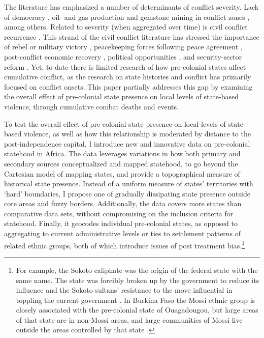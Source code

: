 \documentclass[12pt]{article}
\begin{document}
The literature has emphasized a number of determinants of conflict severity.
Lack of democracy \citep{Lacina_2006}, oil- and gas production and gemstone
mining in conflict zones \citep{Lujala_2008}, among others. Related to severity
(when aggregated over time) is civil conflict recurrence \citep{Collier2003b}.
This strand of the civil conflict literature has stressed the importance of
rebel or military victory \citep{Luttwak_1999, Quinn2007, Toft_2010},
peacekeeping forces following peace agreement \citep{Collier_2008, Quinn2007},
post-conflict economic recovery \citep{Collier_2008, Quinn2007}, political
opportunities \citep{Walter_2004}, and security-sector reform \citep{Toft_2009}.
Yet, to date there is limited research of how pre-colonial states affect
cumulative conflict, as the research on state histories and conflict has
primarily focused on conflict onsets. This paper partially addresses this gap by
examining the overall effect of pre-colonial state presence on local levels of
state-based violence, through cumulative combat deaths and events. 

To test the overall effect of pre-colonial state presence on local levels of
state-based violence, as well as how this relationship is moderated by distance
to the post-independence capital, I introduce new and innovative data on
pre-colonial statehood in Africa. The data leverages variations in how both
primary and secondary sources conceptualized and mapped statehood, to go beyond
the Cartesian model of mapping states, and provide a topographical measure of
historical state presence. Instead of a uniform measure of states' territories
with `hard' boundaries, I propose one of gradually dissipating state presence
outside core areas and fuzzy borders. Additionally, the data covers more states
than comparative data sets, without compromising on the inclusion criteria for
statehood. Finally, it geocodes individual pre-colonial states, as opposed to
aggregating to current administrative levels or ties to settlement patterns of
related ethnic groups, both of which introduce issues of post treatment
bias.\footnote{For example, the Sokoto caliphate was the origin of the federal
state with the same name. The state was forcibly broken up by the government to
reduce its influence and the Sokoto sultans' resistance to the move influential
in toppling the current government \citep{HiribarrenVincent2017AHoB}. In Burkina
Faso the Mossi ethnic group is closely associated with the pre-colonial state of
Ouagadougou, but large areas of that state are in non-Mossi areas, and large
communities of Mossi live outside the areas controlled by that state
\citep{Wishman2021a}.}
\end{document}

